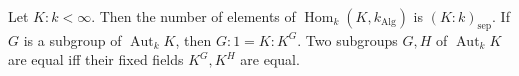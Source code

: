 Let $K:k < \infty$. Then the number of elements of $\operatorname{Hom}_k(K, k_{\text{Alg}})$ is $(K:k)_{\text{sep}}$. If $G$ is a subgroup of $\operatorname{Aut}_kK$, then $G:1 = K:K^G$. Two subgroups $G, H$ of $\operatorname{Aut}_kK$ are equal iff their fixed fields $K^G, K^H$ are equal.
